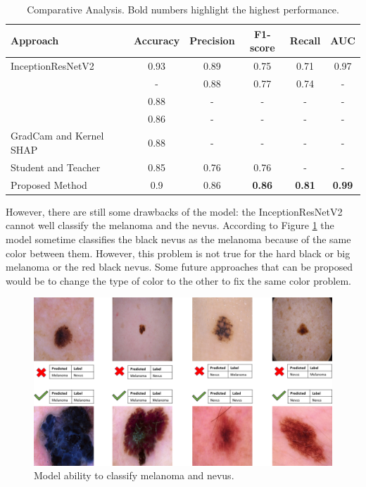 \documentclass[sensors,article,accept,pdftex,moreauthors]{Definitions/mdpi}
\begin{document}
	
	
	\begin{table}[H]
		\caption{Comparative Analysis. Bold numbers highlight the highest performance.}
		\label{table:comparative-analysis}
				\setlength{\tabcolsep}{1.6mm}\begin{tabular}{ p{5cm}  c  c  c  c  c }
\toprule
\textbf{Approach} & \textbf{Accuracy} & \textbf{Precision} & \textbf{F1-score} & \textbf{Recall} & \textbf{AUC}\\
\midrule
InceptionResNetV2~\cite{03358} & 0.93 & 0.89 & 0.75 & 0.71 & 0.97\\
\midrule
\cite{03798} & - & 0.88 & 0.77 & 0.74 & - \\
\midrule
\cite{09418} & 0.88 & - & - & - & - \\
\midrule
\cite{01284} & 0.86 & - & - & - & - \\
\midrule
GradCam and Kernel SHAP~\cite{06612} & 0.88 & - & - & - & - \\
\midrule
Student and Teacher~\cite{03225} & 0.85 & 0.76 & 0.76 & - & - \\
\midrule
Proposed Method & 0.9	& 0.86 & {\textbf{0.86}} & {\textbf{0.81}} & {\textbf{0.99}}%
\\
\bottomrule
		\end{tabular}
	\end{table} 

However, there are still some drawbacks of the model: the InceptionResNetV2 cannot well classify the melanoma and the nevus. According to Figure \ref{fig:nevusVSmela} the model sometime classifies the black nevus as the melanoma because of the same color between them. However, this problem is not true for the hard black or big melanoma or the red black nevus. Some future approaches that can be proposed would be to change the type of color to the other to fix the same color problem.    
	
	\begin{figure}[H]
		\centering
		\includegraphics[width=0.9\linewidth]{Definitions/img_class_nevus_mela}
		\caption{Model ability to classify melanoma and nevus.}
		\label{fig:nevusVSmela}
	\end{figure}
	
\end{document}
